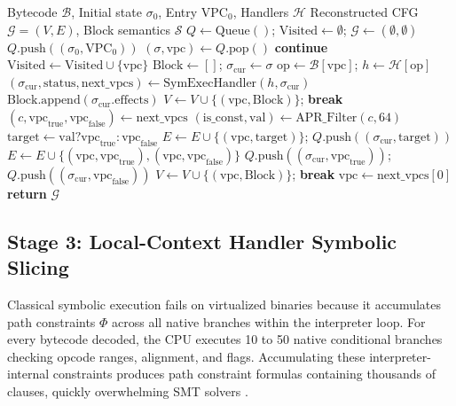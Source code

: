 \documentclass[11pt,a4paper]{article}
\begin{document}
\begin{algorithm}[!t]
\caption{Local-Context Handler Symbolic Slicing}
\label{alg_vpc}
\begin{algorithmic}[1]
\REQUIRE Bytecode $\mathcal{B}$, Initial state $\sigma_0$, Entry $\text{VPC}_0$, Handlers $\mathcal{H}$
\ENSURE Reconstructed CFG $\mathcal{G} = (V, E)$, Block semantics $\mathcal{S}$
\STATE $Q \leftarrow \text{Queue}()$; $\text{Visited} \leftarrow \emptyset$; $\mathcal{G} \leftarrow (\emptyset, \emptyset)$
\STATE $Q.\text{push}((\sigma_0, \text{VPC}_0))$
    \STATE $(\sigma, \text{vpc}) \leftarrow Q.\text{pop}()$
        \STATE \textbf{continue}
    \ENDIF
    \STATE $\text{Visited} \leftarrow \text{Visited} \cup \{\text{vpc}\}$
    \STATE $\text{Block} \leftarrow []$; $\sigma_{\text{cur}} \leftarrow \sigma$
        \STATE $\text{op} \leftarrow \mathcal{B}[\text{vpc}]$; $h \leftarrow \mathcal{H}[\text{op}]$
        \STATE $(\sigma_{\text{cur}}, \text{status}, \text{next\_vpcs}) \leftarrow \text{SymExecHandler}(h, \sigma_{\text{cur}})$
        \STATE $\text{Block}.\text{append}(\sigma_{\text{cur}}.\text{effects})$
            \STATE $V \leftarrow V \cup \{(\text{vpc}, \text{Block})\}$; \textbf{break}
            \STATE $(c, \text{vpc}_{\text{true}}, \text{vpc}_{\text{false}}) \leftarrow \text{next\_vpcs}$
            \STATE $(\text{is\_const}, \text{val}) \leftarrow \text{APR\_Filter}(c, 64)$
                \STATE $\text{target} \leftarrow \text{val} ? \text{vpc}_{\text{true}} : \text{vpc}_{\text{false}}$
                \STATE $E \leftarrow E \cup \{(\text{vpc}, \text{target})\}$; $Q.\text{push}((\sigma_{\text{cur}}, \text{target}))$
            \ELSE
                \STATE $E \leftarrow E \cup \{(\text{vpc}, \text{vpc}_{\text{true}}), (\text{vpc}, \text{vpc}_{\text{false}})\}$
                \STATE $Q.\text{push}((\sigma_{\text{cur}}, \text{vpc}_{\text{true}}))$; $Q.\text{push}((\sigma_{\text{cur}}, \text{vpc}_{\text{false}}))$
            \ENDIF
            \STATE $V \leftarrow V \cup \{(\text{vpc}, \text{Block})\}$; \textbf{break}
        \ELSE
            \STATE $\text{vpc} \leftarrow \text{next\_vpcs}[0]$
        \ENDIF
    \ENDWHILE
\ENDWHILE
\STATE \textbf{return} $\mathcal{G}$
\end{algorithmic}
\end{algorithm}

\subsection{Stage 3: Local-Context Handler Symbolic Slicing}
Classical symbolic execution fails on virtualized binaries because it accumulates path constraints $\Phi$ across all native branches within the interpreter loop. For every bytecode decoded, the CPU executes 10 to 50 native conditional branches checking opcode ranges, alignment, and flags. Accumulating these interpreter-internal constraints produces path constraint formulas containing thousands of clauses, quickly overwhelming SMT solvers \cite{king1976, banescu2016}.
\end{document}
